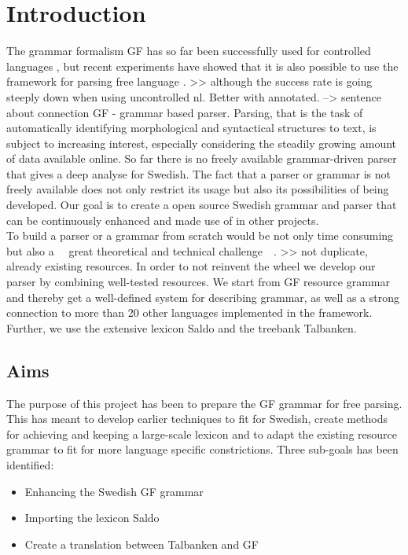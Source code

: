 \documentclass{report}
\begin{document}
\chapter{Introduction}
The grammar formalism GF \cite{gfbok} has so far been successfully used for 
controlled languages \cite{cnl}, but recent experiments have showed
that it is also possible to use the framework for parsing free language \cite{patent}.
 >> although the success rate is going steeply down when using uncontrolled nl. Better with annotated.
 --> sentence about connection GF - grammar based parser.
Parsing, that is the task of automatically identifying morphological and
syntactical structures to text, is subject to increasing interest, especially
considering the steadily growing amount of data available online. 
So far there is no freely available grammar-driven parser that gives a deep analyse for
Swedish. The fact that %
a parser or grammar is not freely available does not only restrict its
usage but also its possibilities of being developed. Our
goal is
to create a open source Swedish grammar and parser that can be continuously enhanced and
made use of in other projects.\\
To build a parser or a grammar from scratch would be not only time consuming but
also a ~~great theoretical and technical challenge~~.
>> not duplicate, already existing resources.
In order to not reinvent the wheel
we develop our parser by combining well-tested resources.
We start from GF resource grammar and thereby get
a well-defined system for describing grammar, as well as a strong connection to
more than 20 other languages implemented in the framework. Further, we use
the extensive lexicon Saldo and the treebank Talbanken.


\section{Aims}
The purpose of this project has been to prepare the GF grammar for free parsing.
This has meant to develop earlier techniques to fit for Swedish, create methods
for achieving and keeping a large-scale lexicon and to adapt the existing
resource grammar to fit for more language specific constrictions.
Three sub-goals has been identified:
\begin{itemize}
\item Enhancing the Swedish GF grammar
\item Importing the lexicon Saldo
\item Create a translation between Talbanken and GF
\end{itemize}
\end{document}
